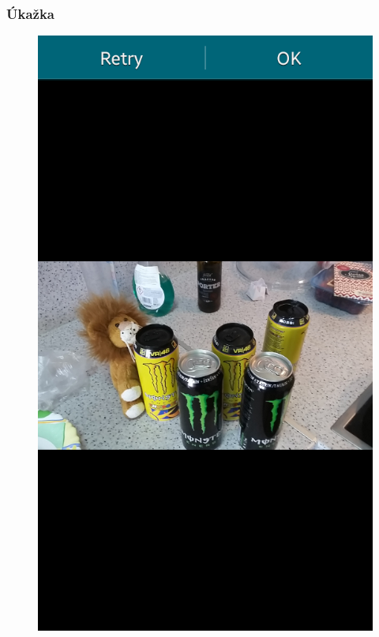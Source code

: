 \documentclass{beamer}
\begin{document}
\begin{frame}
    \frametitle{Úkažka}
    \begin{figure}
    \centerline{\includegraphics[height=0.8 \textheight]{images/screen_4.png}}
    
    \end{figure}
\end{frame}
\end{document}
